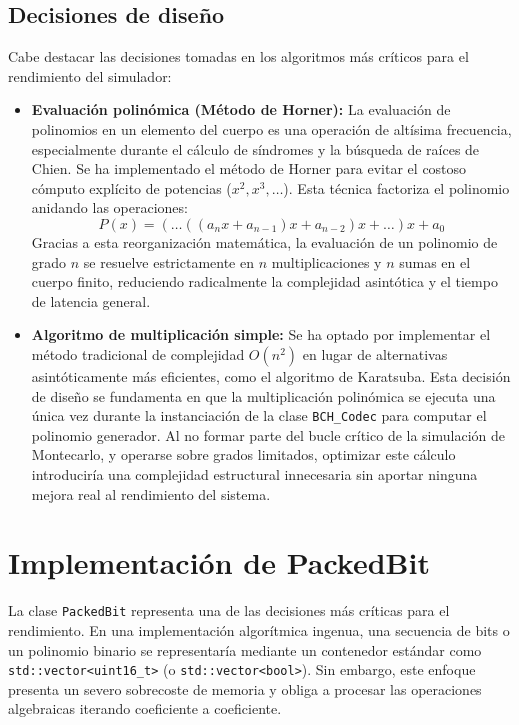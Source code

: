 \subsection{Decisiones de diseño}
Cabe destacar las decisiones tomadas en los algoritmos más críticos para el rendimiento del simulador:
\begin{itemize}
    \item \textbf{Evaluación polinómica (Método de Horner):} La evaluación de polinomios en un elemento del cuerpo es una operación de altísima frecuencia, especialmente durante el cálculo de síndromes y la búsqueda de raíces de Chien. Se ha implementado el método de Horner para evitar el costoso cómputo explícito de potencias ($x^2, x^3, \dots$). Esta técnica factoriza el polinomio anidando las operaciones:
    $$
    P(x) = (\dots((a_n x + a_{n-1})x + a_{n-2})x + \dots )x + a_0
    $$
    Gracias a esta reorganización matemática, la evaluación de un polinomio de grado $n$ se resuelve estrictamente en $n$ multiplicaciones y $n$ sumas en el cuerpo finito, reduciendo radicalmente la complejidad asintótica y el tiempo de latencia general.

    \item \textbf{Algoritmo de multiplicación simple:} Se ha optado por implementar el método tradicional de complejidad $O(n^2)$ en lugar de alternativas asintóticamente más eficientes, como el algoritmo de Karatsuba. Esta decisión de diseño se fundamenta en que la multiplicación polinómica se ejecuta una única vez durante la instanciación de la clase \texttt{BCH\_Codec} para computar el polinomio generador. Al no formar parte del bucle crítico de la simulación de Montecarlo, y operarse sobre grados limitados, optimizar este cálculo introduciría una complejidad estructural innecesaria sin aportar ninguna mejora real al rendimiento del sistema.
\end{itemize}

\section{Implementación de PackedBit}
\label{sec:packedbit}

La clase \texttt{PackedBit} representa una de las decisiones más críticas para el rendimiento. En una implementación algorítmica ingenua, una secuencia de bits o un polinomio binario se representaría mediante un contenedor estándar como \texttt{std::vector<uint16\_t>} (o \texttt{std::vector<bool>}). Sin embargo, este enfoque presenta un severo sobrecoste de memoria y obliga a procesar las operaciones algebraicas iterando coeficiente a coeficiente.


